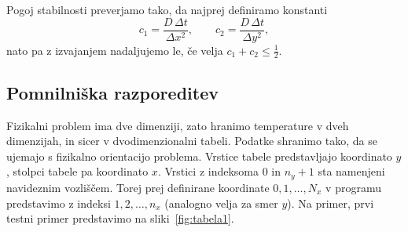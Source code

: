 \documentclass[a4paper,11pt]{article}
\begin{document}
	Pogoj stabilnosti preverjamo tako, da najprej definiramo konstanti
	\begin{equation}
		c_1 = \frac{D\,\Delta t}{\Delta x^2}, \qquad c_2 = \frac{D\,\Delta t}{\Delta y^2},
	\end{equation}
	nato pa z izvajanjem nadaljujemo le, če velja $c_1 + c_2 \leq \frac{1}{2}$.
	
	\subsection{Pomnilniška razporeditev}
	
	Fizikalni problem ima dve dimenziji, zato hranimo temperature v dveh dimenzijah, in sicer v dvodimenzionalni tabeli. Podatke shranimo tako, da se ujemajo s fizikalno orientacijo problema. Vrstice tabele predstavljajo koordinato $y$, stolpci tabele pa koordinato $x$. Vrstici z indeksoma $0$ in $n_y + 1$ sta namenjeni navideznim vozliščem. Torej prej definirane koordinate $0, 1, \dots, N_x$ v programu predstavimo z indeksi $1, 2, \dots, n_x$ (analogno velja za smer $y$). Na primer, prvi testni primer predstavimo na sliki~\ref{fig:tabela1}.
	
\end{document}

